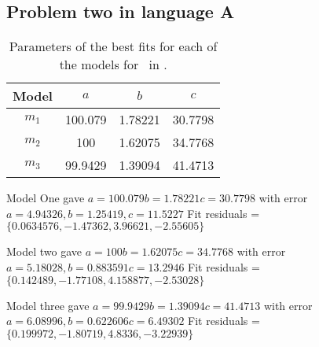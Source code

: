 \subsection{Problem two in language A} \label{subsecP2LA}

\begin{table}
\centering
\begin{tabular}{|c|c|c|c|}
\hline
{\bf Model} &  $a$ & $b$ & $c$ \\
\hline
$m_1$ & 100.079 & 1.78221 & 30.7798 \\
\hline
$m_2$ & 100 & 1.62075 & 34.7768\\
\hline
$m_3$ & 99.9429 & 1.39094 & 41.4713 \\
\hline
\end{tabular}
\caption{Parameters of the best fits for each of the models for \PT\ in \LA.}
\label{table:P2LA:abc}
\end{table}

Model One gave
$a = 100.079 b = 1.78221 c = 30.7798$
with error $a = 4.94326, b = 1.25419, c = 11.5227$
Fit residuals = $\{0.0634576, -1.47362, 3.96621, -2.55605\}$

Model two gave
$a = 100 b = 1.62075 c = 34.7768$
with error $a = 5.18028, b = 0.883591 c = 13.2946$
Fit residuals = $\{0.142489, -1.77108, 4.158877, -2.53028\}$

Model three gave
$a = 99.9429 b = 1.39094 c = 41.4713$ with error
$a = 6.08996, b = 0.622606 c = 6.49302$
Fit residuals = $\{0.199972, -1.80719, 4.8336, -3.22939\}$
